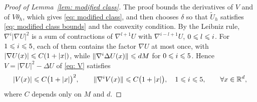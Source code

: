 \begin{proof}[Proof of Lemma~\ref{lem: modified class}]
    The proof bounds the derivatives of $V$ and of $V\theta_h$, which gives \eqref{eq: modified class}, and then chooses $\delta$ so that $\tilde U_h$ satisfies \eqref{eq: modified class bounds} and the convexity condition. By the Leibniz rule, $\nabla^i |\nabla U|^2$ is a sum of contractions of $\nabla^{l+1} U$ with $\nabla^{i-l+1} U$, $0 \leqslant l \leqslant i$. For $1 \leqslant i \leqslant 5$, each of them contains the factor $\nabla U$ at most once, with $|\nabla U(x)| \leqslant C(1+|x|)$, while $\lVert \nabla^i \Delta U(x) \rVert \leqslant dM$ for $0 \leqslant i \leqslant 5$. Hence $V = |\nabla U|^2 - \Delta U$ of \eqref{eq: V} satisfies
    \begin{equation}
        |V(x)| \leqslant C \bigl( 1 + |x| \bigr)^2 , \qquad \lVert \nabla^i V(x) \rVert \leqslant C \bigl( 1 + |x| \bigr) , \quad 1 \leqslant i \leqslant 5 , \qquad \forall x \in \mathbb R^d ,
        \label{eq: V growth}
    \end{equation}
    where $C$ depends only on $M$ and $d$.


\end{proof}
